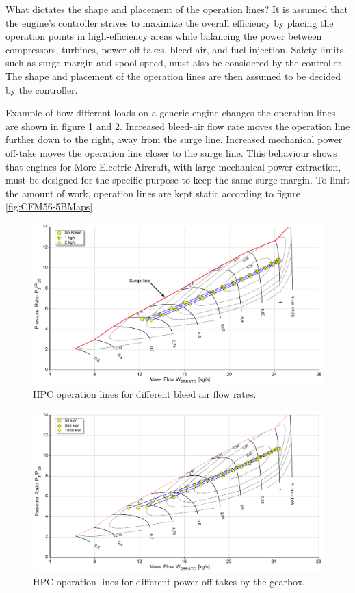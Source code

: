 \documentclass[english]{kththesis}
\begin{document}
What dictates the shape and placement of the operation lines? It is assumed that the engine's controller strives to maximize the overall efficiency by placing the operation points in high-efficiency areas while balancing the power between compressors, turbines, power off-takes, bleed air, and fuel injection.
Safety limits, such as surge margin and spool speed, must also be considered by the controller. The shape and placement of the operation lines are then assumed to be decided by the controller.

Example of how different loads on a generic engine changes the operation lines are shown in figure \ref{fig:GasTurbHPCMapBleed} and \ref{fig:GasTurbHPCMapPower}. Increased bleed-air flow rate moves the operation line further down to the right, away from the surge line. Increased mechanical power off-take moves the operation line closer to the surge line. This behaviour shows that engines for More Electric Aircraft, with large mechanical power extraction, must be designed for the specific purpose to keep the same surge margin.
To limit the amount of work, operation lines are kept static according to figure \ref{fig:CFM56-5BMaps}.

\begin{figure}[hb]
    \centering
    \includegraphics[width=1\textwidth]{Epictures/HPC_Map_Bleed.png}
    \caption{HPC operation lines for different bleed air flow rates.}
    \label{fig:GasTurbHPCMapBleed}
\end{figure}

\begin{figure}[hb]
    \centering
    \includegraphics[width=1\textwidth]{Epictures/HPC_Map_PowerOfftakes.png}
    \caption{HPC operation lines for different power off-takes by the gearbox.}
    \label{fig:GasTurbHPCMapPower}
\end{figure}
\end{document}
